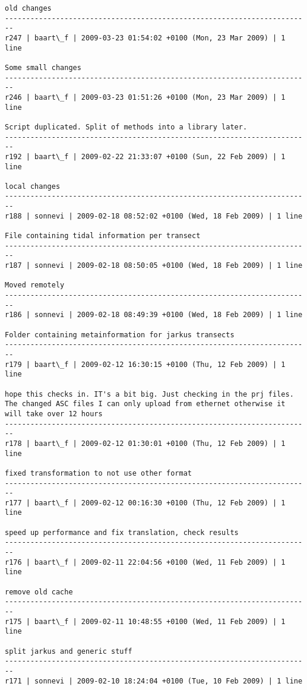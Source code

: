 \documentclass[9]{report}
\begin{document}
\begin{description}
\begin{verbatim}
old changes
------------------------------------------------------------------------
r247 | baart\_f | 2009-03-23 01:54:02 +0100 (Mon, 23 Mar 2009) | 1 line

Some small changes
------------------------------------------------------------------------
r246 | baart\_f | 2009-03-23 01:51:26 +0100 (Mon, 23 Mar 2009) | 1 line

Script duplicated. Split of methods into a library later. 
------------------------------------------------------------------------
r192 | baart\_f | 2009-02-22 21:33:07 +0100 (Sun, 22 Feb 2009) | 1 line

local changes
------------------------------------------------------------------------
r188 | sonnevi | 2009-02-18 08:52:02 +0100 (Wed, 18 Feb 2009) | 1 line

File containing tidal information per transect
------------------------------------------------------------------------
r187 | sonnevi | 2009-02-18 08:50:05 +0100 (Wed, 18 Feb 2009) | 1 line

Moved remotely
------------------------------------------------------------------------
r186 | sonnevi | 2009-02-18 08:49:39 +0100 (Wed, 18 Feb 2009) | 1 line

Folder containing metainformation for jarkus transects
------------------------------------------------------------------------
r179 | baart\_f | 2009-02-12 16:30:15 +0100 (Thu, 12 Feb 2009) | 1 line

hope this checks in. IT's a bit big. Just checking in the prj files. The changed ASC files I can only upload from ethernet otherwise it will take over 12 hours
------------------------------------------------------------------------
r178 | baart\_f | 2009-02-12 01:30:01 +0100 (Thu, 12 Feb 2009) | 1 line

fixed transformation to not use other format
------------------------------------------------------------------------
r177 | baart\_f | 2009-02-12 00:16:30 +0100 (Thu, 12 Feb 2009) | 1 line

speed up performance and fix translation, check results
------------------------------------------------------------------------
r176 | baart\_f | 2009-02-11 22:04:56 +0100 (Wed, 11 Feb 2009) | 1 line

remove old cache
------------------------------------------------------------------------
r175 | baart\_f | 2009-02-11 10:48:55 +0100 (Wed, 11 Feb 2009) | 1 line

split jarkus and generic stuff
------------------------------------------------------------------------
r171 | sonnevi | 2009-02-10 18:24:04 +0100 (Tue, 10 Feb 2009) | 1 line


\end{verbatim}
\end{description}
\end{document}
